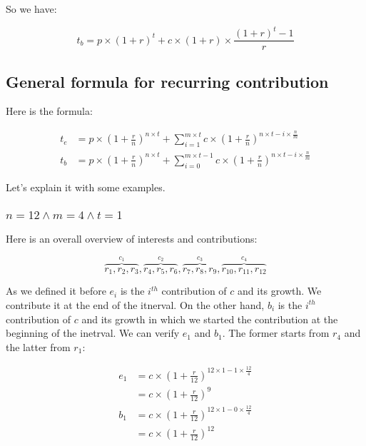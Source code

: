 \documentclass{book}
\begin{document}
	So we have:
	
	\begin{equation*}
		t_b = p \times (1 + r)^t + c \times (1 + r) \times \frac{(1 +r)^t - 1}{r}
	\end{equation*}
	\subsection{General formula for recurring contribution}
	
	Here is the formula:
	
	\begin{equation*}
		\begin{split}
		t_e &= p \times (1 + \frac{r}{n})^{n \times t} + \sum_{i = 1}^{m \times t}{c \times (1 + \frac{r}{n})^{n \times t - i \times \frac{n}{m}}} \\
		t_b &= p \times (1 + \frac{r}{n})^{n \times t} + \sum_{i = 0}^{m \times t - 1}{c \times (1 + \frac{r}{n})^{n \times t - i \times \frac{n}{m}}}
		\end{split}
	\end{equation*}
	
	Let's explain it with some examples.
	
	\subsubsection{$n = 12 \land m = 4 \land t = 1$}
	
	Here is an overall overview of interests and contributions:
	
	\begin{equation*}
		\overbrace{r_1, r_2, r_3}^{c_1}, \overbrace{r_4, r_5, r_6}^{c_2}, \overbrace{r_7, r_8, r_9}^{c_3}, \overbrace{r_{10}, r_{11}, r_{12}}^{c_4}		
	\end{equation*}
	
	As we defined it before $e_i$ is the $i^{th}$ contribution of $c$ and its growth. We contribute it at the end of the itnerval. On the other hand, $b_i$ is the $i^{th}$ contribution of $c$ and its growth in which we started the contribution at the beginning of the inetrval. We can verify $e_1$  and $b_1$. The former starts from $r_4$ and the latter from $r_1$:
	
	\begin{equation*}
		\begin{split}
			e_1 &= c \times (1 + \frac{r}{12})^{12 \times 1 - 1 \times \frac{12}{4}} \\
			&= c \times (1 + \frac{r}{12})^{9} \\
			b_1 &= c \times (1 + \frac{r}{12})^{12 \times 1 - 0 \times \frac{12}{4}} \\
			&= c \times (1 + \frac{r}{12})^{12}
		\end{split}
	\end{equation*}
	
\end{document}
